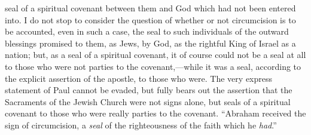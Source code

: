 \documentclass[
  english,
]{book}
\begin{document}
seal of a spiritual covenant between them and God which had not been entered into. I do not stop to consider the question of whether or not circumcision is to be accounted, even in such a case, the seal to such individuals of the outward blessings promised to them, as Jews, by God, as the rightful King of Israel as a nation; but, as a seal of a spiritual covenant, it of course could not be a seal at all to those who were not parties to the covenant,---while it was a seal, according to the explicit assertion of the apostle, to those who were. The very express statement of Paul cannot be evaded, but fully bears out the assertion that the Sacraments of the Jewish Church were not signs alone, but seals of a spiritual covenant to those who were really parties to the covenant. ``Abraham received the sign of circumcision, a \emph{seal} of the righteousness of the faith which he \emph{had}.''
\end{document}
